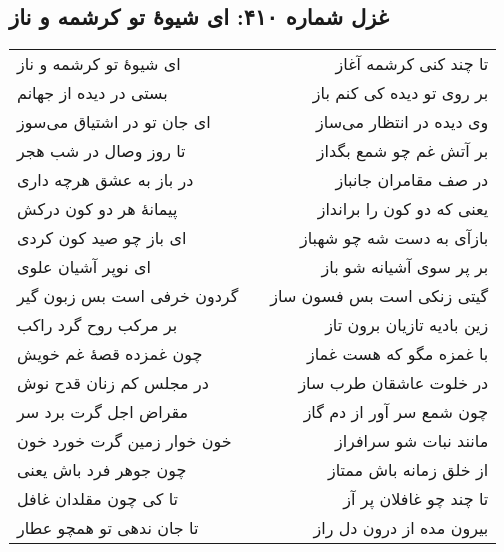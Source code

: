 \begin{center}
\section*{غزل شماره ۴۱۰: ای شیوهٔ تو کرشمه و ناز}
\label{sec:410}
\begin{longtable}{l p{0.5cm} r}
ای شیوهٔ تو کرشمه و ناز
&&
تا چند کنی کرشمه آغاز
\\
بستی در دیده از جهانم
&&
بر روی تو دیده کی کنم باز
\\
ای جان تو در اشتیاق می‌سوز
&&
وی دیده در انتظار می‌ساز
\\
تا روز وصال در شب هجر
&&
بر آتش غم چو شمع بگداز
\\
در باز به عشق هرچه داری
&&
در صف مقامران جانباز
\\
پیمانهٔ هر دو کون درکش
&&
یعنی که دو کون را برانداز
\\
ای باز چو صید کون کردی
&&
بازآی به دست شه چو شهباز
\\
ای نوپر آشیان علوی
&&
بر پر سوی آشیانه شو باز
\\
گردون خرفی است بس زبون گیر
&&
گیتی زنکی است بس فسون ساز
\\
بر مرکب روح گرد راکب
&&
زین بادیه تازیان برون تاز
\\
چون غمزده قصهٔ غم خویش
&&
با غمزه مگو که هست غماز
\\
در مجلس کم زنان قدح نوش
&&
در خلوت عاشقان طرب ساز
\\
مقراض اجل گرت برد سر
&&
چون شمع سر آور از دم گاز
\\
خون خوار زمین گرت خورد خون
&&
مانند نبات شو سرافراز
\\
چون جوهر فرد باش یعنی
&&
از خلق زمانه باش ممتاز
\\
تا کی چون مقلدان غافل
&&
تا چند چو غافلان پر آز
\\
تا جان ندهی تو همچو عطار
&&
بیرون مده از درون دل راز
\\
\end{longtable}
\end{center}
